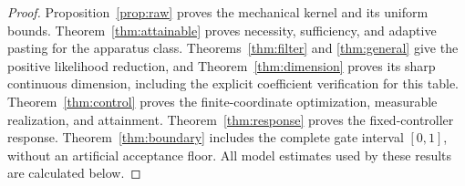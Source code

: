 \begin{proof}
Proposition~\ref{prop:raw} proves the mechanical kernel and its uniform
bounds. Theorem~\ref{thm:attainable} proves necessity, sufficiency, and
adaptive pasting for the apparatus class. Theorems~\ref{thm:filter} and
\ref{thm:general} give the positive likelihood reduction, and
Theorem~\ref{thm:dimension} proves its sharp continuous dimension, including the
explicit coefficient verification for this table. Theorem~\ref{thm:control}
proves the finite-coordinate optimization, measurable realization, and
attainment. Theorem~\ref{thm:response} proves the fixed-controller response.
Theorem~\ref{thm:boundary} includes the complete gate interval $[0,1]$,
without an artificial acceptance floor. All model estimates used by these
results are calculated below.
\end{proof}

